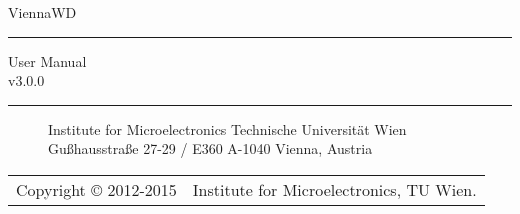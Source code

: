 \documentclass[11pt]{report}
\begin{document}

\begin{titlepage}

\vspace*{3cm}
\Huge{ViennaWD}
\rule[0.0cm]{12.3cm}{0.05cm}
\begin{flushright}
\Large{User Manual\\}
\Large{v3.0.0}
\end{flushright}

\vspace{12cm}
\rule[0.0cm]{16.0cm}{0.05cm}
\begin{figure}[!ht]
   \vspace{-1.0cm}
   \centering
   \begin{minipage}{3cm}
   \end{minipage}
   \hfill
   \hspace{-0.5cm}
   \begin{minipage}{5.5cm}
      \vspace{0.5cm}
      \begin{center}
      Institute for Microelectronics\newline
      Technische Universit\"at Wien\newline
      Gu\ss hausstra\ss e 27-29 / E360\newline
      A-1040 Vienna, Austria\newline
      \end{center}
   \end{minipage}
   \hfill
   \begin{minipage}{2.6cm}
   \end{minipage}
\end{figure}

\end{titlepage}
\clearpage
\begin{tabular}{ll}
Copyright {\copyright} 2012-2015 & Institute for Microelectronics, TU Wien.
\end{tabular}
\end{document}
